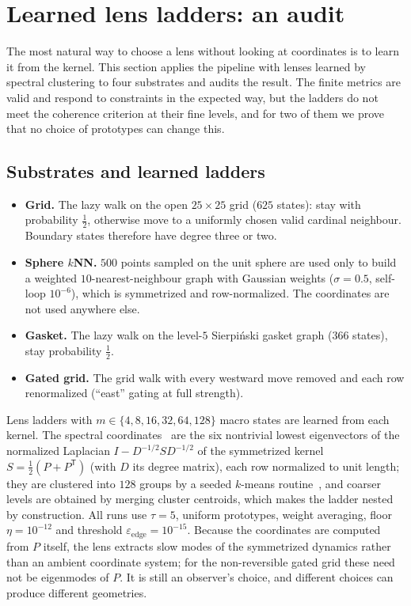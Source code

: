 \section{Learned lens ladders: an audit}
\label{sec:learned}

The most natural way to choose a lens without looking at coordinates is to learn it from the kernel.
This section applies the pipeline with lenses learned by spectral clustering to four substrates and audits the result.
The finite metrics are valid and respond to constraints in the expected way, but the ladders do not meet the coherence criterion at their fine levels, and for two of them we prove that no choice of prototypes can change this.

\subsection{Substrates and learned ladders}
\label{sec:substrates}

\begin{itemize}[leftmargin=*]
\item \textbf{Grid.} The lazy walk on the open $25\times25$ grid ($625$ states): stay with probability $\tfrac12$, otherwise move to a uniformly chosen valid cardinal neighbour. Boundary states therefore have degree three or two.
\item \textbf{Sphere $k$NN.} $500$ points sampled on the unit sphere are used only to build a weighted $10$-nearest-neighbour graph with Gaussian weights ($\sigma=0.5$, self-loop $10^{-6}$), which is symmetrized and row-normalized. The coordinates are not used anywhere else.
\item \textbf{Gasket.} The lazy walk on the level-$5$ Sierpi\'nski gasket graph ($366$ states), stay probability $\tfrac12$.
\item \textbf{Gated grid.} The grid walk with every westward move removed and each row renormalized (``east'' gating at full strength).
\end{itemize}
Lens ladders with $m\in\{4,8,16,32,64,128\}$ macro states are learned from each kernel.
The spectral coordinates~\cite{CoifmanLafon2006,vonLuxburg2007} are the six nontrivial lowest eigenvectors of the normalized Laplacian $I-D^{-1/2}SD^{-1/2}$ of the symmetrized kernel $S=\tfrac12(P+P^{\mathsf T})$ (with $D$ its degree matrix), each row normalized to unit length; they are clustered into $128$ groups by a seeded $k$-means routine~\cite{Lloyd1982}, and coarser levels are obtained by merging cluster centroids, which makes the ladder nested by construction.
All runs use $\tau=5$, uniform prototypes, weight averaging, floor $\eta=10^{-12}$ and threshold $\varepsilon_{\mathrm{edge}}=10^{-15}$.
Because the coordinates are computed from $P$ itself, the lens extracts slow modes of the symmetrized dynamics rather than an ambient coordinate system; for the non-reversible gated grid these need not be eigenmodes of $P$.
It is still an observer's choice, and different choices can produce different geometries.

